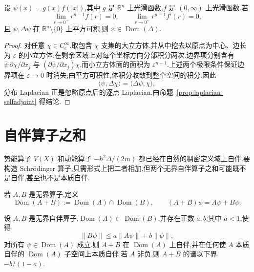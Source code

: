 \begin{proposition}\label{prop:radial-laplacian-domain}
设 \(\psi(x)=g(x)f(|x|)\),其中 \(g\) 是 \(\mathbb{R}^{n}\) 上光滑函数,\(f\) 是 \((0,\infty)\) 上光滑函数.若
\[
\lim_{r\to0^{+}}r^{n-1}f(r)=0,
\qquad
\lim_{r\to0^{+}}r^{n-1}f'(r)=0,
\]
且 \(\psi,\Delta\psi\) 在 \(\mathbb{R}^{n}\setminus\{0\}\) 上平方可积,则 \(\psi\in\operatorname{Dom}(\Delta)\).
\end{proposition}

\begin{proof}
对任意 \(\chi\in C_{c}^{\infty}\),取包含 \(\chi\) 支集的大立方体,并从中挖去以原点为中心、边长为 \(\varepsilon\) 的小立方体.在剩余区域上对每个坐标方向分部积分两次.边界项分别含有 \(\overline\psi\,\partial\chi/\partial x_{j}\) 与 \((\partial\overline\psi/\partial x_{j})\chi\),而小立方体面的面积为 \(\varepsilon^{n-1}\).上述两个极限条件保证边界项在 \(\varepsilon\to0\) 时消失;由平方可积性,体积分收敛到整个空间的积分.因此
\[
\langle\psi,\Delta\chi\rangle=\langle\Delta\psi,\chi\rangle,
\]
分布 Laplacian 正是忽略原点后的逐点 Laplacian.由命题~\ref{prop:laplacian-selfadjoint} 得结论.
\end{proof}

\section{自伴算子之和}
\label{sec:sums-selfadjoint}

势能算子 \(V(X)\) 和动能算子 \(-\hbar^{2}\Delta/(2m)\) 都已经在自然的稠密定义域上自伴.要构造 Schrödinger 算子,只需形式上把二者相加,但两个无界自伴算子之和可能既不是自伴,甚至也不是本质自伴.

\begin{definition}[无界算子之和]\label{def:unbounded-sum}
若 \(A,B\) 是无界算子,定义
\[
\operatorname{Dom}(A+B):=\operatorname{Dom}(A)\cap\operatorname{Dom}(B),
\qquad
(A+B)\psi=A\psi+B\psi.
\]
\end{definition}

\begin{theorem}\label{thm:kato-rellich}
设 \(A,B\) 是无界自伴算子,\(\operatorname{Dom}(A)\subset\operatorname{Dom}(B)\),并存在正数 \(a,b\),其中 \(a<1\),使得
\[
\|B\psi\|\leq a\|A\psi\|+b\|\psi\|,
\label{eq:kato-rellich-bound}
\]
对所有 \(\psi\in\operatorname{Dom}(A)\) 成立.则 \(A+B\) 在 \(\operatorname{Dom}(A)\) 上自伴,并在任何使 \(A\) 本质自伴的 \(\operatorname{Dom}(A)\) 子空间上本质自伴.若 \(A\) 非负,则 \(A+B\) 的谱以下界 \(-b/(1-a)\).
\end{theorem}

